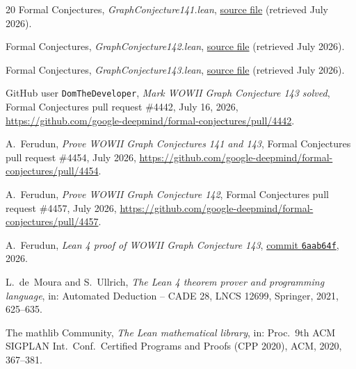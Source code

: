\documentclass[11pt]{article}
\numberwithin{equation}{section}
\theoremstyle{remark}
\begin{document}
\begin{thebibliography}{20}
Formal Conjectures,
\emph{GraphConjecture141.lean},
\href{https://github.com/google-deepmind/formal-conjectures/blob/main/FormalConjectures/WrittenOnTheWallII/GraphConjecture141.lean}{source file}
(retrieved July 2026).

Formal Conjectures,
\emph{GraphConjecture142.lean},
\href{https://github.com/google-deepmind/formal-conjectures/blob/main/FormalConjectures/WrittenOnTheWallII/GraphConjecture142.lean}{source file}
(retrieved July 2026).

Formal Conjectures,
\emph{GraphConjecture143.lean},
\href{https://github.com/google-deepmind/formal-conjectures/blob/main/FormalConjectures/WrittenOnTheWallII/GraphConjecture143.lean}{source file}
(retrieved July 2026).

GitHub user \texttt{DomTheDeveloper},
\emph{Mark WOWII Graph Conjecture 143 solved},
Formal Conjectures pull request \#4442, July 16, 2026,
\url{https://github.com/google-deepmind/formal-conjectures/pull/4442}.

A.~Ferudun,
\emph{Prove WOWII Graph Conjectures 141 and 143},
Formal Conjectures pull request \#4454, July 2026,
\url{https://github.com/google-deepmind/formal-conjectures/pull/4454}.

A.~Ferudun,
\emph{Prove WOWII Graph Conjecture 142},
Formal Conjectures pull request \#4457, July 2026,
\url{https://github.com/google-deepmind/formal-conjectures/pull/4457}.

A.~Ferudun,
\emph{Lean 4 proof of WOWII Graph Conjecture 143},
\href{https://github.com/AlperTheKing/formal-conjectures/commit/6aab64fe70c1309463435260d104863dcef93807}{commit \texttt{6aab64f}}, 2026.

L.~de~Moura and S.~Ullrich,
\emph{The Lean 4 theorem prover and programming language},
in: Automated Deduction -- CADE 28, LNCS 12699, Springer, 2021, 625--635.

The mathlib Community,
\emph{The Lean mathematical library},
in: Proc.\ 9th ACM SIGPLAN Int.\ Conf.\ Certified Programs and Proofs
(CPP 2020), ACM, 2020, 367--381.

\end{thebibliography}
\end{document}
